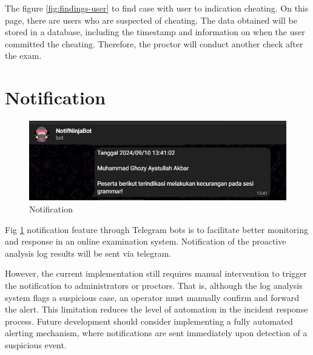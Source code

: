 The figure \ref{fig:findings-user} to find case with user to indication cheating. On this page, there are users who are suspected of cheating. The data obtained will be stored in a database, including the timestamp and information on when the user committed the cheating. Therefore, the proctor will conduct another check after the exam.



\section{Notification}

\begin{figure}[H] 
    \centering
    \includegraphics[width=14cm]{figure/log-notification.jpeg}
    \caption{Notification}
    \label{fig:telegram-notification}
\end{figure}

Fig \ref{fig:telegram-notification} notification feature through Telegram bots is to facilitate better monitoring and response in an online examination system. Notification of the proactive analysis log results will be sent via telegram. 

However, the current implementation still requires manual intervention to trigger the notification to administrators or proctors. That is, although the log analysis system flags a suspicious case, an operator must manually confirm and forward the alert. This limitation reduces the level of automation in the incident response process. Future development should consider implementing a fully automated alerting mechanism, where notifications are sent immediately upon detection of a suspicious event.
